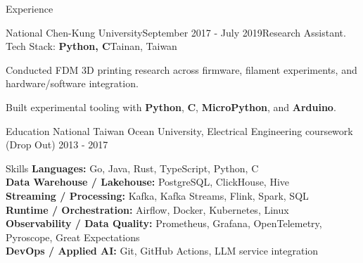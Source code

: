 \documentclass[
	11pt, %
]{resume} %
\begin{document}
\begin{rSection}{Experience}
	\begin{rSubsection}{National Chen-Kung University}{September 2017 - July 2019}{Research Assistant. Tech Stack: \color{teal}\textbf{Python, C}}{Tainan, Taiwan}
            \item Conducted FDM 3D printing research across firmware, filament experiments, and hardware/software integration.
            \item Built experimental tooling with \textbf{Python}, \textbf{C}, \textbf{MicroPython}, and \textbf{Arduino}.
	\end{rSubsection}
\end{rSection}


\begin{rSection}{Education}
National Taiwan Ocean University, Electrical Engineering coursework (Drop Out) \hfill 2013 - 2017
\end{rSection}


\begin{rSection}{Skills}
\textbf{Languages:} Go, Java, Rust, TypeScript, Python, C \\
\textbf{Data Warehouse / Lakehouse:} PostgreSQL, ClickHouse, Hive \\
\textbf{Streaming / Processing:} Kafka, Kafka Streams, Flink, Spark, SQL \\
\textbf{Runtime / Orchestration:} Airflow, Docker, Kubernetes, Linux \\
\textbf{Observability / Data Quality:} Prometheus, Grafana, OpenTelemetry, Pyroscope, Great Expectations \\
\textbf{DevOps / Applied AI:} Git, GitHub Actions, LLM service integration
\end{rSection}






\end{document}
